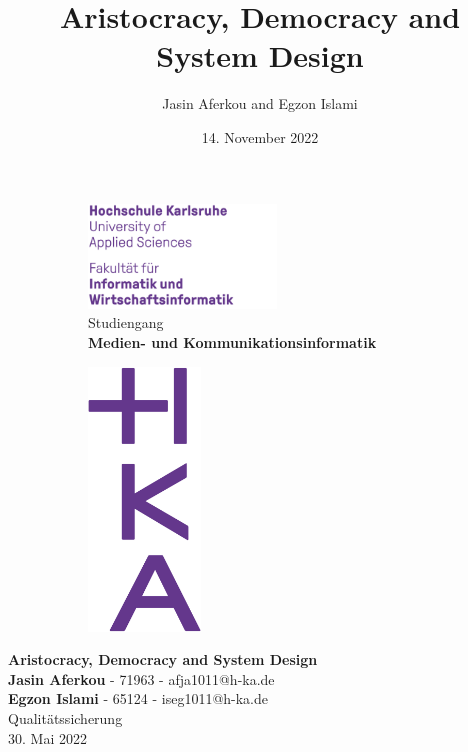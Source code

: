 \documentclass[a4paper, ngerman, 12pt, usenames, dvipsnames]{article}
\title{Aristocracy, Democracy and System Design}
\author{Jasin Aferkou and Egzon Islami}
\date{14. November 2022}
\begin{document}
\begin{titlepage}

    \begin{figure}[h]
        \begin{subfigure}[t]{10cm}
            \vskip 0pt
            \includegraphics[width=5cm,left]{images/HKA_IWI_Wortmarke_RGB.jpg}\\
            Studiengang\\
            \textbf{Medien- und Kommunikationsinformatik}\\
        \end{subfigure}
        \begin{subfigure}[t]{3cm}
            \vskip 0pt
            \includegraphics[width=3cm,right]{images/HKA_IWI_Bildmarke_RGB.jpg}
        \end{subfigure}
    \end{figure}
    \begin{center}
        \Large
        \vspace{1cm}
        \huge
        \textbf{Aristocracy, Democracy and System Design}\\
        \vspace{2cm}
        \normalsize
        \textbf{Jasin Aferkou} - 71963 - afja1011@h-ka.de\\
        \textbf{Egzon Islami} - 65124 - iseg1011@h-ka.de\\
        
        \vspace{2cm}
        Qualitätssicherung\\
        \vspace{1.5cm}
        \small
        30. Mai 2022
    \end{center}
\end{titlepage}
\pagebreak
\end{document}
